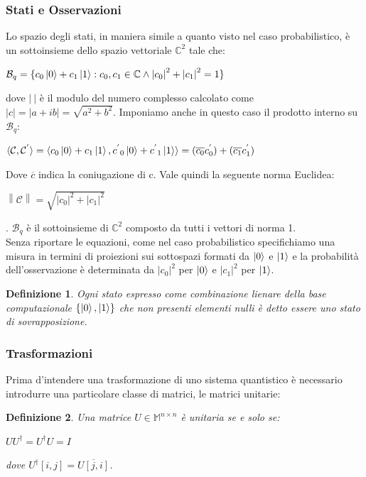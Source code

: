 \documentclass[12pt,a4paper,openright]{report}
\newcommand{\norm}[1]{\left\lVert#1\right\rVert}
\newtheorem{mydef}{Definizione}[chapter]
\begin{document}
\subsubsection{Stati e Osservazioni}

Lo spazio degli stati, in maniera simile a quanto visto nel caso probabilistico, è un sottoinsieme dello spazio vettoriale $\mathbb{C}^2$ tale che:
\begin{center}
    $\mathcal{B}_q=\{c_0\ket0 + c_1\ket1 : c_0,c_1 \in \mathbb{C} \land {\left\vert{c_0}\right\vert}^2 + {\left\vert{c_1}\right\vert}^2 = 1 \} $
\end{center}
dove $\left\vert{\:}\right\vert$ è il modulo del numero complesso calcolato come $\left\vert{c}\right\vert = \left\vert{a + ib}\right\vert = \sqrt{a^2 + b^2}$.
Imponiamo anche in questo caso il prodotto interno su $\mathcal{B}_q$:
\begin{center}
    $\langle\mathcal{C},\mathcal{C^{'}}\rangle=\langle c_0\ket0 + c_1\ket1, {c^{'}}_0\ket0 + {c^{'}}_1\ket1 \rangle = (\overline{c_0}c^{'}_0) + (\overline{c_1}c^{'}_1)$
\end{center}
Dove $\overline{c}$ indica la coniugazione di c. Vale quindi la seguente norma Euclidea:
\begin{center}
    $\norm{\mathcal{C}}= \sqrt{{\left\vert{c_0}\right\vert}^2 + {\left\vert{c_1}\right\vert}^2}$
\end{center}
. $\mathcal{B}_q$ è il sottoinsieme di $\mathbb{C}^2$ composto da tutti i vettori di norma 1.\\
Senza riportare le equazioni, come nel caso probabilistico specifichiamo una misura in termini di proiezioni sui sottospazi formati da $\ket0$ e $\ket1$ e la probabilità 
dell'osservazione è determinata da ${\left\vert{c_0}\right\vert}^2$ per $\ket0$ e  ${\left\vert{c_1}\right\vert}^2$ per $\ket1$.

\begin{mydef}
    Ogni stato espresso come combinazione lienare della base computazionale $\{\ket0,\ket1\}$ che non presenti elementi nulli è detto essere uno 
    stato di sovrapposizione.
\end{mydef}
\subsubsection{Trasformazioni}
Prima d'intendere una trasformazione di uno sistema quantistico è necessario introdurre una particolare classe di matrici, le matrici unitarie:\newpage
\begin{mydef}
    Una matrice $U\in\mathbb{M}^{n\times{n}}$ è unitaria se e solo se:
    \begin{center}
        $UU^\dag=U^{\dag}U=I$
    \end{center} 
    dove $U^{\dag}[i,j]=\overline{U[j,i]}$.
\end{mydef}
\end{document}
